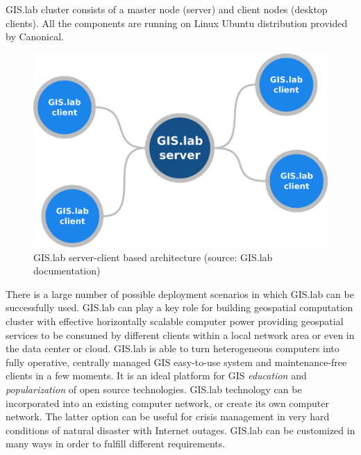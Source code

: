 \documentclass{isprs}
\begin{document}
GIS.lab cluster consists of a master node (server) and client nodes
(desktop clients). All the components are running on Linux Ubuntu
distribution provided by Canonical.

\begin{figure}[ht!]
\begin{center}
  \includegraphics[width=.7\columnwidth]{figures/gislab-server-client-architecture.png}
  \caption{GIS.lab server-client based architecture (source: GIS.lab
    documentation)}
\label{fig:gislab_infrastructure}
\end{center}
\end{figure}

There is a large number of possible deployment scenarios in which
GIS.lab can be successfully used. GIS.lab can play a key role for
building geospatial computation cluster with effective horizontally
scalable computer power providing geospatial services to be consumed
by different clients within a local network area or even in the data
center or cloud. GIS.lab is able to turn heterogeneous computers into
fully operative, centrally managed GIS easy-to-use system and
maintenance-free clients in a few moments. It is an ideal platform for GIS
\textit{education} and \textit{popularization} of open source
technologies. GIS.lab technology can be incorporated into
an existing computer network, or create its own computer
network. The latter option can be useful for crisis management in very
hard conditions of natural disaster with Internet outages. GIS.lab can
be customized in many ways in order to fulfill different requirements.
\end{document}
